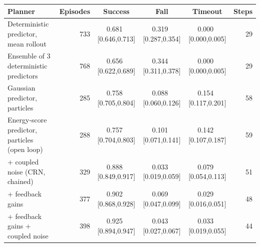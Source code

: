 \begin{tabular}{lrcccr}
\toprule
Planner & Episodes & Success & Fall & Timeout & Steps \\
\midrule
Deterministic predictor, mean rollout & 733 & 0.681 \,[0.646,0.713] & 0.319 \,[0.287,0.354] & 0.000 \,[0.000,0.005] & 29 \\
Ensemble of 3 deterministic predictors & 768 & 0.656 \,[0.622,0.689] & 0.344 \,[0.311,0.378] & 0.000 \,[0.000,0.005] & 29 \\
Gaussian predictor, particles & 285 & 0.758 \,[0.705,0.804] & 0.088 \,[0.060,0.126] & 0.154 \,[0.117,0.201] & 58 \\
\midrule
Energy-score predictor, particles (open loop) & 288 & 0.757 \,[0.704,0.803] & 0.101 \,[0.071,0.141] & 0.142 \,[0.107,0.187] & 59 \\
\quad + coupled noise (CRN, chained) & 329 & 0.888 \,[0.849,0.917] & 0.033 \,[0.019,0.059] & 0.079 \,[0.054,0.113] & 51 \\
\quad + feedback gains & 377 & 0.902 \,[0.868,0.928] & 0.069 \,[0.047,0.099] & 0.029 \,[0.016,0.051] & 48 \\
\quad + feedback gains + coupled noise & 398 & 0.925 \,[0.894,0.947] & 0.043 \,[0.027,0.067] & 0.033 \,[0.019,0.055] & 44 \\
\bottomrule
\end{tabular}

